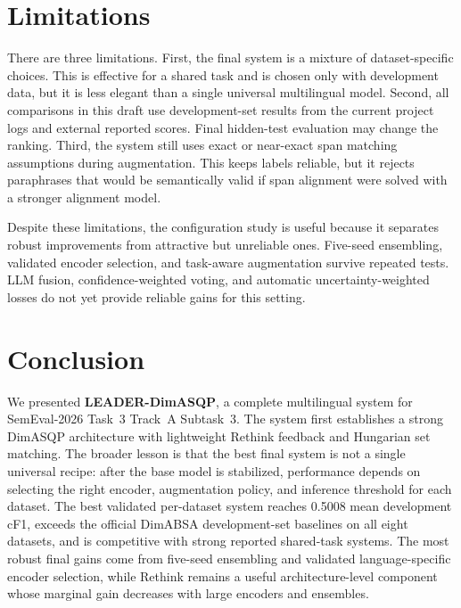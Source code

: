 \documentclass[runningheads]{llncs}
\begin{document}
\section{Limitations}

There are three limitations. First, the final system is a mixture of
dataset-specific choices. This is effective for a shared task and is
chosen only with development data, but it is less elegant than a single
universal multilingual model. Second, all comparisons in this draft use
development-set results from the current project logs and external
reported scores. Final hidden-test evaluation may change the ranking.
Third, the system still uses exact or near-exact span matching
assumptions during augmentation.
This keeps labels reliable, but it rejects paraphrases that would be
semantically valid if span alignment were solved with a stronger
alignment model.

Despite these limitations, the configuration study is useful because it
separates robust improvements from attractive but unreliable ones.
Five-seed ensembling, validated encoder selection, and task-aware
augmentation survive repeated tests. LLM fusion, confidence-weighted
voting, and automatic uncertainty-weighted losses do not yet provide
reliable gains for this setting.

\section{Conclusion}

We presented \textbf{LEADER-DimASQP}, a complete multilingual system
for SemEval-2026 Task~3 Track~A Subtask~3. The system first establishes
a strong DimASQP architecture with lightweight Rethink feedback and
Hungarian set matching. The broader lesson is that the best final
system is not a single universal recipe: after the base model is
stabilized, performance depends on selecting the right encoder,
augmentation policy, and inference threshold for each dataset. The
best validated per-dataset system reaches 0.5008 mean development cF1, exceeds
the official DimABSA development-set baselines on all eight datasets,
and is competitive with strong reported shared-task systems. The most
robust final gains come from five-seed ensembling and validated
language-specific encoder selection, while Rethink remains a useful
architecture-level component whose marginal gain decreases with large
encoders and ensembles.
\end{document}
